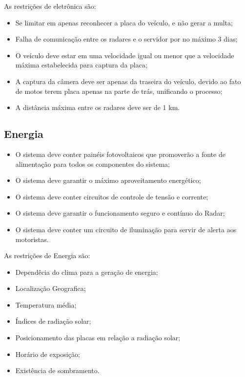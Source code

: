     As restrições de eletrônica são:

\begin{itemize}

	\item Se limitar em apenas reconhecer a placa do veículo, e não gerar a multa;
	\item Falha de comunicação entre os radares e o servidor por no máximo 3 dias;
	\item O veículo deve estar em uma velocidade igual ou menor que a velocidade máxima estabelecida para captura da placa;
	\item A captura da câmera deve ser apenas da traseira do veículo, devido ao fato de motos terem placa apenas na parte de trás, unificando o processo;
	\item A distância máxima entre os radares deve ser de 1 km.
	
\end{itemize} 	
	
\subsection{Energia}
\begin{itemize}
	\item O sistema deve conter painéis fotovoltaicos que promoverão a fonte de alimentação para todos os componentes do sistema;
	\item O sistema deve garantir o máximo aproveitamento energético;
	\item O sistema deve conter circuitos de controle de tensão e corrente;
	\item O sistema deve garantir o funcionamento seguro e contínuo do Radar;
	\item O sistema deve conter um circuito de iluminação para servir de alerta aos motoristas.

\end{itemize}

As restrições de Energia são:
\begin{itemize}
   \item Dependêcia do clima para a geração de energia;
   \item Localização Geografica;
   \item Temperatura média;
   \item Índices de radiação solar;
   \item Posicionamento das placas em relação a radiação solar;
   \item Horário de exposição;
   \item Existência de sombramento.
 \end{itemize}
